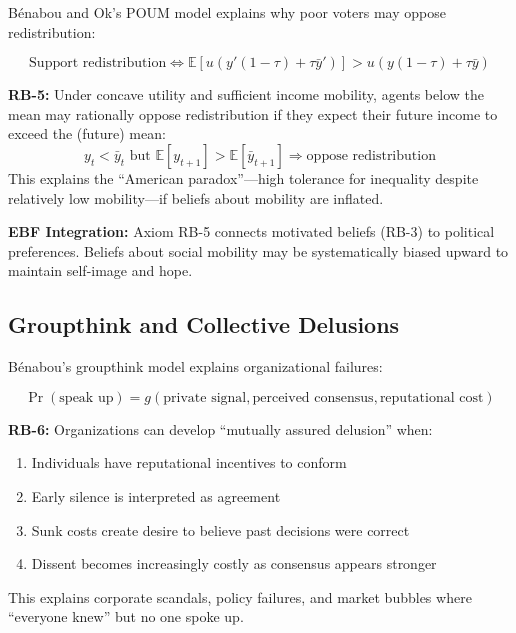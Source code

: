 Bénabou and Ok's POUM model \citep{PAP-benabou_ok_2001_mobility} explains why poor voters may oppose redistribution:

\begin{equation}
\text{Support redistribution} \Leftrightarrow \mathbb{E}[u(y'(1-\tau) + \tau\bar{y}')] > u(y(1-\tau) + \tau\bar{y})
\label{eq:rb-poum}
\end{equation}

\begin{axiom}
\label{ax:rb-5}
\textbf{RB-5:} Under concave utility and sufficient income mobility, agents below the mean may rationally oppose redistribution if they expect their future income to exceed the (future) mean:
\begin{equation}
y_t < \bar{y}_t \text{ but } \mathbb{E}[y_{t+1}] > \mathbb{E}[\bar{y}_{t+1}] \Rightarrow \text{oppose redistribution}
\end{equation}
This explains the ``American paradox''---high tolerance for inequality despite relatively low mobility---if beliefs about mobility are inflated.
\end{axiom}

\textbf{EBF Integration:} Axiom RB-5 connects motivated beliefs (RB-3) to political preferences. Beliefs about social mobility may be systematically biased upward to maintain self-image and hope.

\subsection{Groupthink and Collective Delusions}
\label{subsec:rb-groupthink}

Bénabou's groupthink model \citep{PAP-benabou_2013_groupthink} explains organizational failures:

\begin{equation}
\Pr(\text{speak up}) = g\left(\text{private signal}, \text{perceived consensus}, \text{reputational cost}\right)
\label{eq:rb-groupthink}
\end{equation}

\begin{axiom}
\label{ax:rb-6}
\textbf{RB-6:} Organizations can develop ``mutually assured delusion'' when:
\begin{enumerate}
    \item Individuals have reputational incentives to conform
    \item Early silence is interpreted as agreement
    \item Sunk costs create desire to believe past decisions were correct
    \item Dissent becomes increasingly costly as consensus appears stronger
\end{enumerate}
This explains corporate scandals, policy failures, and market bubbles where ``everyone knew'' but no one spoke up.
\end{axiom}


